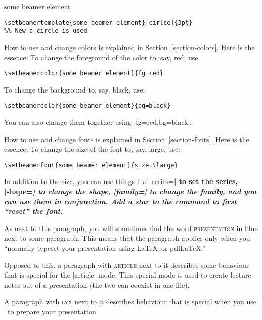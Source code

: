 \begin{element}{some beamer element}
\begin{verbatim}
\setbeamertemplate{some beamer element}[cirlce]{3pt}
%% New a circle is used
\end{verbatim}
  
  How to use and change colors is explained in
  Section~\ref{section-colors}. Here is the essence: To change the
  foreground of the color to, say, red, use
\begin{verbatim}
\setbeamercolor{some beamer element}{fg=red}
\end{verbatim}
  To change the background to, say, black, use:
\begin{verbatim}
\setbeamercolor{some beamer element}{bg=black}
\end{verbatim}
  You can also change them together using |fg=red,bg=black|.

  How to use and change fonts is explained in
  Section~\ref{section-fonts}. Here is the essence: To change the size
  of the font to, say, large, use:
\begin{verbatim}
\setbeamerfont{some beamer element}{size=\large}
\end{verbatim}
  In addition to the size, you can use things like |series=\bfseries|
  to set the series, |shape=\itshape| to change the shape, 
  |family=\sffamily| to change the family, and you can use them in
  conjunction. Add a star to the command to first ``reset'' the font.
\end{element}


\beamernote
As next to this paragraph, you will sometimes find the word
\textsc{presentation} in blue next to some paragraph. This means that
the paragraph applies only when you ``normally typeset your
presentation using \LaTeX\ or pdf\LaTeX.''

\articlenote
Opposed to this, a paragraph with \textsc{article} next to it
describes some behaviour that is special for the |article| mode. This
special mode is used to create lecture notes out of a presentation
(the two can coexist in one file).

\lyxnote
A paragraph with \textsc{lyx} next to it describes behaviour that is
special when you use \LyX\ to prepare your presentation.



